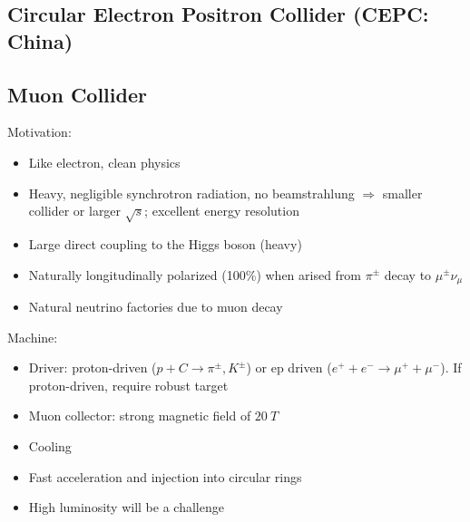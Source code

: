 \subsection{Circular Electron Positron Collider (CEPC: China)}

\subsection{Muon Collider}
Motivation:
\begin{itemize}
    \item Like electron, clean physics
    \item Heavy, negligible synchrotron radiation, no beamstrahlung $\Rightarrow$
	smaller collider or larger $\sqrt{s}$; excellent energy resolution
    \item Large direct coupling to the Higgs boson (heavy)
    \item Naturally longitudinally polarized (100\%) when arised from $\pi^\pm$ 
	decay to $\mu^\pm\nu_\mu$
    \item Natural neutrino factories due to muon decay
\end{itemize}

Machine:
\begin{itemize}
    \item Driver: proton-driven ($p + C \rightarrow \pi^\pm, K^\pm$) or 
	ep driven ($e^+ + e^- \rightarrow \mu^+ + \mu^-$).
	If proton-driven, require robust target
    \item Muon collector: strong magnetic field of $20\ T$
    \item Cooling
    \item Fast acceleration and injection into circular rings
    \item High luminosity will be a challenge
\end{itemize}
